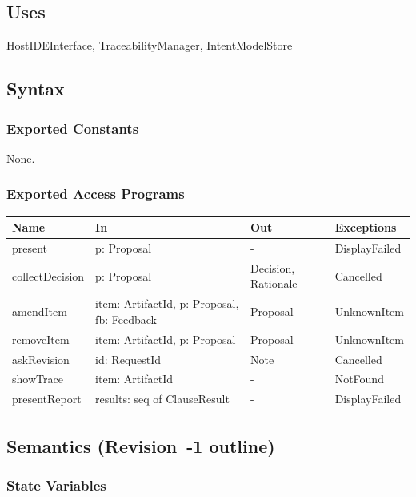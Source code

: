 \documentclass[12pt, titlepage]{article}
\begin{document}
\subsection{Uses}

HostIDEInterface, TraceabilityManager, IntentModelStore

\subsection{Syntax}

\subsubsection{Exported Constants}

None.

\subsubsection{Exported Access Programs}

\begin{center}
\small
\begin{tabular}{>{\raggedright\arraybackslash}p{3.7cm} >{\raggedright\arraybackslash}p{3.8cm} >{\raggedright\arraybackslash}p{3.6cm} >{\raggedright\arraybackslash}p{3.7cm}}
\hline
\textbf{Name} & \textbf{In} & \textbf{Out} & \textbf{Exceptions} \\
\hline
present & p: Proposal & - & DisplayFailed \\
collectDecision & p: Proposal & Decision, Rationale & Cancelled \\
amendItem & item: ArtifactId, p: Proposal, fb: Feedback & Proposal & UnknownItem \\
removeItem & item: ArtifactId, p: Proposal & Proposal & UnknownItem \\
askRevision & id: RequestId & Note & Cancelled \\
showTrace & item: ArtifactId & - & NotFound \\
presentReport & results: seq of ClauseResult & - & DisplayFailed \\
\hline
\end{tabular}
\end{center}

\subsection{Semantics (Revision~-1 outline)}

\subsubsection{State Variables}
\end{document}
